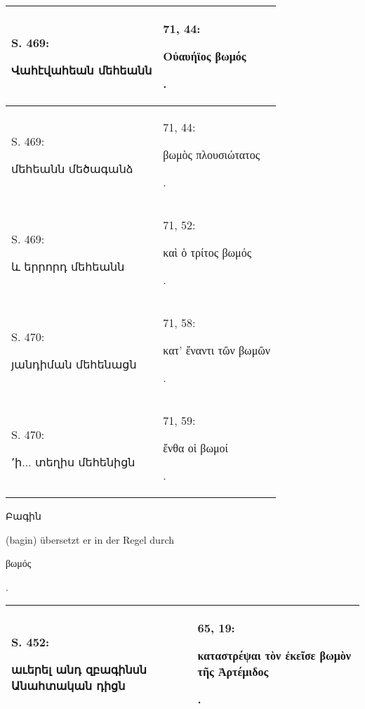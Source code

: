 \documentclass{article}
\begin{document}
{\begin{table}[H]
\begin{tabular}{p{45mm}|p{45mm}}
        S. 469: \begin{armenian}Վահէվահեան մեհեանն\end{armenian} & 71, 44: \begin{greek}Οὐαυήϊος βωμός\end{greek}.   \\ \hline
        S. 469: \begin{armenian}մեհեանն մեծագանձ\end{armenian} & 71, 44: \begin{greek}βωμὸς πλουσιώτατος\end{greek}.   \\ \hline
        S. 469: \begin{armenian}և երրորդ մեհեանն\end{armenian} & 71, 52: \begin{greek}καὶ ὁ τρίτος βωμός\end{greek}.   \\ \hline
        S. 470: \begin{armenian}յանդիման մեհենացն\end{armenian} & 71, 58: \begin{greek}κατ' ἔναντι τῶν βωμῶν\end{greek}.   \\ \hline
        S. 470: \begin{armenian}՚ի... տեղիս մեհենիցն\end{armenian} & 71, 59: \begin{greek}ἔνθα οἱ βωμοί\end{greek}. \\ \hline
    \end{tabular}
\end{table}
\hspace*{5mm}\begin{armenian}Բագին\end{armenian} (bagin) übersetzt er in der Regel durch \begin{greek}βωμός\end{greek}.  
\begin{table}[H]
    \centering
    \tiny
    \begin{tabular}{p{45mm}|p{45mm}}
    \hline
        S. 452: \begin{armenian}աւերել անդ զբագինսն Անահտական դիցն\end{armenian} & 65, 19: \begin{greek}καταστρέψαι τὸν ἐκεῖσε βωμὸν τῆς Ἀρτέμιδος\end{greek}.   \\ \hline

\end{tabular}
\end{table}}
\end{document}
